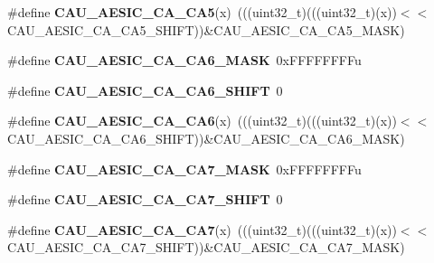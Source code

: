 \begin{DoxyCompactItemize}
\item 
\#define {\bfseries C\+A\+U\+\_\+\+A\+E\+S\+I\+C\+\_\+\+C\+A\+\_\+\+C\+A5}(x)~(((uint32\+\_\+t)(((uint32\+\_\+t)(x))$<$$<$C\+A\+U\+\_\+\+A\+E\+S\+I\+C\+\_\+\+C\+A\+\_\+\+C\+A5\+\_\+\+S\+H\+I\+FT))\&C\+A\+U\+\_\+\+A\+E\+S\+I\+C\+\_\+\+C\+A\+\_\+\+C\+A5\+\_\+\+M\+A\+SK)\hypertarget{group__CAU__Register__Masks_gadcf8798d25e40ad79a768ef17e61a6c7}{}\label{group__CAU__Register__Masks_gadcf8798d25e40ad79a768ef17e61a6c7}

\item 
\#define {\bfseries C\+A\+U\+\_\+\+A\+E\+S\+I\+C\+\_\+\+C\+A\+\_\+\+C\+A6\+\_\+\+M\+A\+SK}~0x\+F\+F\+F\+F\+F\+F\+F\+Fu\hypertarget{group__CAU__Register__Masks_ga54d6732429da2f76aaca8e48c1f24a65}{}\label{group__CAU__Register__Masks_ga54d6732429da2f76aaca8e48c1f24a65}

\item 
\#define {\bfseries C\+A\+U\+\_\+\+A\+E\+S\+I\+C\+\_\+\+C\+A\+\_\+\+C\+A6\+\_\+\+S\+H\+I\+FT}~0\hypertarget{group__CAU__Register__Masks_ga69a702861a7ada57557747440c673f2f}{}\label{group__CAU__Register__Masks_ga69a702861a7ada57557747440c673f2f}

\item 
\#define {\bfseries C\+A\+U\+\_\+\+A\+E\+S\+I\+C\+\_\+\+C\+A\+\_\+\+C\+A6}(x)~(((uint32\+\_\+t)(((uint32\+\_\+t)(x))$<$$<$C\+A\+U\+\_\+\+A\+E\+S\+I\+C\+\_\+\+C\+A\+\_\+\+C\+A6\+\_\+\+S\+H\+I\+FT))\&C\+A\+U\+\_\+\+A\+E\+S\+I\+C\+\_\+\+C\+A\+\_\+\+C\+A6\+\_\+\+M\+A\+SK)\hypertarget{group__CAU__Register__Masks_gaccaa1243e2b214333eb520a63219c299}{}\label{group__CAU__Register__Masks_gaccaa1243e2b214333eb520a63219c299}

\item 
\#define {\bfseries C\+A\+U\+\_\+\+A\+E\+S\+I\+C\+\_\+\+C\+A\+\_\+\+C\+A7\+\_\+\+M\+A\+SK}~0x\+F\+F\+F\+F\+F\+F\+F\+Fu\hypertarget{group__CAU__Register__Masks_ga7e45df90e65bd21902c9c393b10d9320}{}\label{group__CAU__Register__Masks_ga7e45df90e65bd21902c9c393b10d9320}

\item 
\#define {\bfseries C\+A\+U\+\_\+\+A\+E\+S\+I\+C\+\_\+\+C\+A\+\_\+\+C\+A7\+\_\+\+S\+H\+I\+FT}~0\hypertarget{group__CAU__Register__Masks_gade98ca14bc2fb9d1b02a074073edcf82}{}\label{group__CAU__Register__Masks_gade98ca14bc2fb9d1b02a074073edcf82}

\item 
\#define {\bfseries C\+A\+U\+\_\+\+A\+E\+S\+I\+C\+\_\+\+C\+A\+\_\+\+C\+A7}(x)~(((uint32\+\_\+t)(((uint32\+\_\+t)(x))$<$$<$C\+A\+U\+\_\+\+A\+E\+S\+I\+C\+\_\+\+C\+A\+\_\+\+C\+A7\+\_\+\+S\+H\+I\+FT))\&C\+A\+U\+\_\+\+A\+E\+S\+I\+C\+\_\+\+C\+A\+\_\+\+C\+A7\+\_\+\+M\+A\+SK)\hypertarget{group__CAU__Register__Masks_ga61776b9b88c7dc4639cc9e2a14ab0aaf}{}\label{group__CAU__Register__Masks_ga61776b9b88c7dc4639cc9e2a14ab0aaf}


\end{DoxyCompactItemize}
